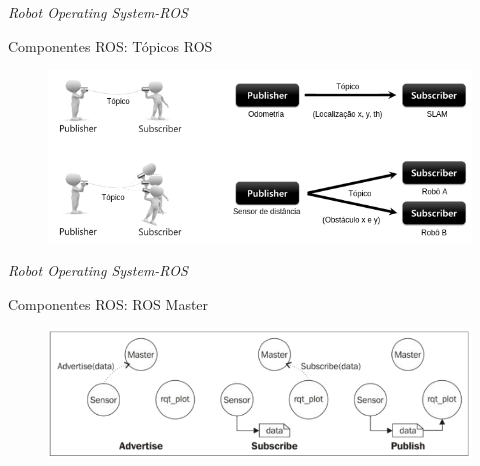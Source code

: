 \documentclass[10pt]{beamer}
\begin{document}
\begin{frame}{\textit{Robot Operating System-ROS}}
	\begin{alertblock}{Componentes ROS: Tópicos ROS}
		\vspace{0.7cm}
		\begin{figure}[h]
			\begin{center}
				\includegraphics[scale=0.41]{imagens/rostopic.png}\\
			\end{center}
			\label{fig:topico}
		\end{figure}
	\end{alertblock}
\end{frame}

\begin{frame}{\textit{Robot Operating System-ROS}}
	\begin{alertblock}{Componentes ROS: ROS Master}
		\vspace{0.7cm}
		\begin{figure}[h]
			\begin{center}
				\includegraphics[scale=0.43]{imagens/rosmaster.png}\\
			\end{center}
			\label{fig:master}
		\end{figure}
	\end{alertblock}
\end{frame}
\end{document}

